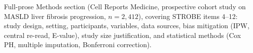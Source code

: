 \caption{Full-prose Methods section (Cell Reports Medicine, prospective cohort study on MASLD liver fibrosis progression, $n=2{,}412$), covering STROBE items 4--12: study design, setting, participants, variables, data sources, bias mitigation (IPW, central re-read, E-value), study size justification, and statistical methods (Cox PH, multiple imputation, Bonferroni correction).}
